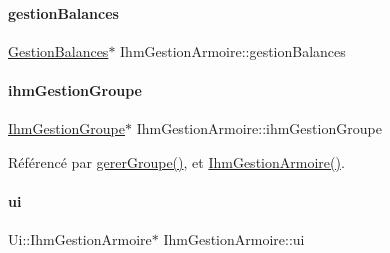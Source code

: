 \paragraph{\texorpdfstring{gestion\+Balances}{gestionBalances}}
{\footnotesize\ttfamily \hyperlink{class_gestion_balances}{Gestion\+Balances}$\ast$ Ihm\+Gestion\+Armoire\+::gestion\+Balances\hspace{0.3cm}{\ttfamily [private]}}

\mbox{\label{class_ihm_gestion_armoire_af590a9a2a114e7ee791db540f87c01ef}} 
\paragraph{\texorpdfstring{ihm\+Gestion\+Groupe}{ihmGestionGroupe}}
{\footnotesize\ttfamily \hyperlink{class_ihm_gestion_groupe}{Ihm\+Gestion\+Groupe}$\ast$ Ihm\+Gestion\+Armoire\+::ihm\+Gestion\+Groupe\hspace{0.3cm}{\ttfamily [private]}}



Référencé par \hyperlink{class_ihm_gestion_armoire_a4cd664c766e29593d3fedf2baea6a330}{gerer\+Groupe()}, et \hyperlink{class_ihm_gestion_armoire_a7aa5e1514dd5d1b5648a2f6dd36970f9}{Ihm\+Gestion\+Armoire()}.

\mbox{\label{class_ihm_gestion_armoire_a793a2816dc21b3161566138d2af5a8b9}} 
\paragraph{\texorpdfstring{ui}{ui}}
{\footnotesize\ttfamily Ui\+::\+Ihm\+Gestion\+Armoire$\ast$ Ihm\+Gestion\+Armoire\+::ui\hspace{0.3cm}{\ttfamily [private]}}



